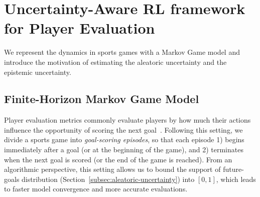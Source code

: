 \documentclass{article}
\newcommand{\dataset}{\mathcal{D}}
\begin{document}
\vspace{-0.05in}
\section{Uncertainty-Aware RL framework for Player Evaluation}
\vspace{-0.05in}
We represent the dynamics in sports games with a Markov Game model and  introduce the motivation of estimating the aleatoric uncertainty and the epistemic uncertainty.
\vspace{-0.05in}
\subsection{Finite-Horizon Markov Game Model}
\vspace{-0.05in}
Player evaluation metrics commonly evaluate players by how much their actions influence the opportunity of scoring the next goal~\cite{Liu2018DRL,Decroos2019Actions,Sun2020Cracking}. Following this setting,  we divide a sports game into {\it goal-scoring episodes}, so that each episode 1) begins immediately after a goal (or at the beginning of the game), and 2) terminates when the next goal is scored (or the end of the game is reached). From an algorithmic perspective, this setting allows us to bound the support of future-goals distribution (Section~\ref{subsec:aleatoric-uncertainty}) into $[0,1]$,
which leads to faster model convergence and more accurate evaluations. 
\end{document}
